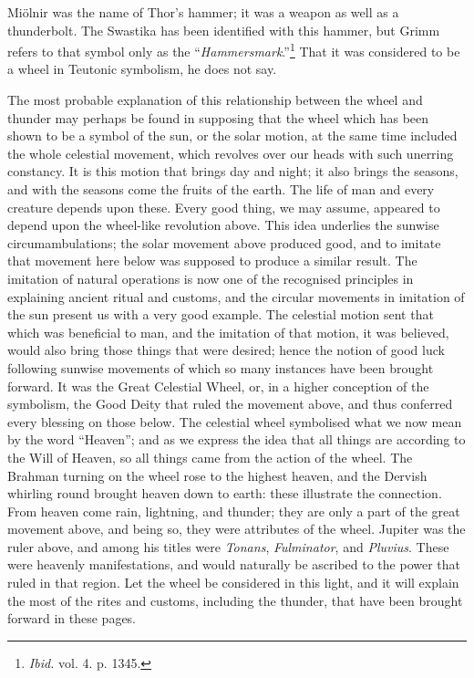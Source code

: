 \documentclass[a4paper, 11pt, oneside, polutonikogreek, english]{article}
\begin{document}
Miölnir was the name of Thor's hammer; it was a weapon as well as a thunderbolt. The Swastika has been identified with this hammer, but Grimm refers to that symbol only as the ``\emph{Hammersmark}.''\footnote{\emph{Ibid.} vol. 4. p. 1345.} That it was considered to be a wheel in Teutonic symbolism, he does not say.

The most probable explanation of this relationship between the wheel and thunder may perhaps be found in supposing that the wheel which has been shown to be a symbol of the sun, or the solar motion, at the same time included the whole celestial movement, which revolves over our heads with such unerring constancy. It is this motion that brings day and night; it also brings the seasons, and with the seasons come the fruits of the earth. The life of man and every creature depends upon these. Every good thing, we may assume, appeared to depend upon the wheel-like revolution above. This idea underlies the sunwise circumambulations; the solar movement above produced good, and to imitate that movement here below was supposed to produce a similar result. The imitation of natural operations is now one of the recognised principles in explaining ancient ritual and customs, and the circular movements in imitation of the sun present us with a very good example. The celestial motion sent that which was beneficial to man, and the imitation of that motion, it was believed, would also bring those things that were desired; hence the notion of good luck following sunwise movements of which so many instances have been brought forward. It was the Great Celestial Wheel, or, in a higher conception of the symbolism, the Good Deity that ruled the movement above, and thus conferred every blessing on those below. The celestial wheel symbolised what we now mean by the word ``Heaven''; and as we express the idea that all things are according to the Will of Heaven, so all things came from the action of the wheel. The Brahman turning on the wheel rose to the highest heaven, and the Dervish whirling round brought heaven down to earth: these illustrate the connection. From heaven come rain, lightning, and thunder; they are only a part of the great movement above, and being so, they were attributes of the wheel. Jupiter was the ruler above, and among his titles were \emph{Tonans}, \emph{Fulminator}, and \emph{Pluvius}. These were heavenly manifestations, and would naturally be ascribed to the power that ruled in that region. Let the wheel be considered in this light, and it will explain the most of the rites and customs, including the thunder, that have been brought forward in these pages.
\clearpage
\end{document}
